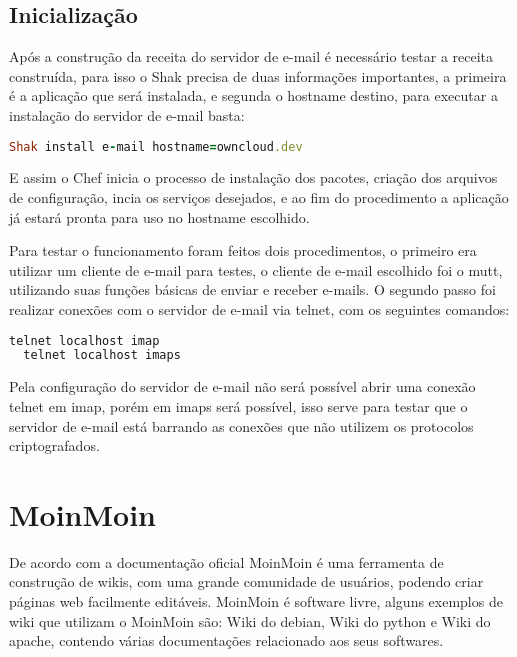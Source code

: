 \subsection{Inicialização}

Após a construção da receita do servidor de e-mail é necessário testar a receita construída,
para isso o Shak precisa de duas informações importantes, a primeira é a aplicação
que será instalada, e segunda o hostname destino, para executar a instalação
do servidor de e-mail basta:

\begin{lstlisting}[language=Ruby,label=dice_index,caption={Exemplo de execução de instalação do servidor de e-mailcom shak}]
Shak install e-mail hostname=owncloud.dev
\end{lstlisting}


E assim o Chef inicia o processo de instalação dos pacotes, criação dos arquivos
de configuração, incia os serviços desejados, e ao fim do procedimento a aplicação
já estará pronta para uso no hostname escolhido.

Para testar o funcionamento foram feitos dois procedimentos, o primeiro era utilizar
um cliente de e-mail para testes, o cliente de e-mail escolhido foi o mutt, utilizando
suas funções básicas de enviar e receber e-mails. O segundo passo foi realizar conexões
com o servidor de e-mail via telnet, com os seguintes comandos:

\begin{lstlisting}[language=Ruby,label=dice_index,caption={Exemplo de teste de conexão telnet no servidor imap}]
  telnet localhost imap
  telnet localhost imaps
\end{lstlisting}

Pela configuração do servidor de e-mail não será possível abrir uma conexão telnet
em imap, porém em imaps será possível, isso serve para testar que o servidor de e-mail
está barrando as conexões que não utilizem os protocolos criptografados.

\section{MoinMoin}
\label{sub:owncloud}

De acordo com a documentação oficial \cite{moin} MoinMoin é uma ferramenta de construção
de wikis, com uma grande comunidade de usuários, podendo criar páginas web
facilmente editáveis. MoinMoin é software livre, alguns exemplos
de wiki que utilizam o MoinMoin são: Wiki do debian, Wiki do python e Wiki do apache,
contendo várias documentações relacionado aos seus softwares.

